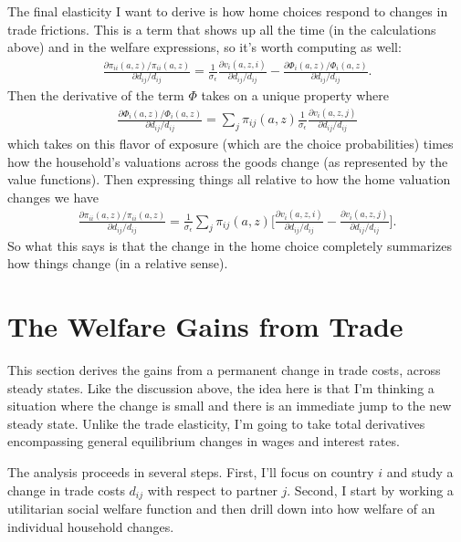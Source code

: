 \documentclass[12pt,pdftex]{article}
\begin{document}
\begin{onehalfspacing}
The final elasticity I want to derive is how home choices respond to changes in trade frictions. This is a term that shows up all the time (in the calculations above) and in the welfare expressions, so it's worth computing as well:
\begin{align}
\frac{\partial \pi_{ii}(a,z) / \pi_{ii}(a,z) }{\partial d_{ij} / d_{ij}} = \frac{1}{\sigma_{\epsilon}}\frac{\partial v_{i}(a,z,i)}{\partial d_{ij}/d_{ij}} - \frac{\partial \Phi_{i}(a,z) / \Phi_{i}(a,z)}{\partial d_{ij}/d_{ij}}.
\end{align}
Then the derivative of the term $\Phi$ takes on a unique property where
\begin{align}
\frac{\partial \Phi_{i}(a,z) / \Phi_{i}(a,z)}{\partial d_{ij}/d_{ij}} = \sum_{j} \pi_{ij}(a,z) \frac{1}{\sigma_{\epsilon}}\frac{\partial v_{i}(a,z,j)}{\partial d_{ij}/d_{ij}}
\end{align}
which takes on this flavor of exposure (which are the choice probabilities) times how the household's valuations across the goods change (as represented by the value functions). Then expressing things all relative to how the home valuation changes we have
\begin{align}
\frac{\partial \pi_{ii}(a,z) / \pi_{ii}(a,z) }{\partial d_{ij} / d_{ij}} = \frac{1}{\sigma_{\epsilon}} \sum_{j} \pi_{ij}(a,z) \bigg[ \frac{\partial v_{i}(a,z,i)}{\partial d_{ij}/d_{ij}} - \frac{\partial v_{i}(a,z,j)}{\partial d_{ij}/d_{ij}} \bigg].
\label{eq:apx-change-home-choice}
\end{align}
So what this says is that the change in the home choice completely summarizes how things change (in a relative sense).

\section{The Welfare Gains from Trade}\label{apx-sec:gains-trade}

This section derives the gains from a permanent change in trade costs, across steady states. Like the discussion above, the idea here is that I'm thinking a situation where the change is small and there is an immediate jump to the new steady state. Unlike the trade elasticity, I'm going to take total derivatives encompassing general equilibrium changes in wages and interest rates.

The analysis proceeds in several steps. First, I'll focus on country $i$ and study a change in trade costs $d_{ij}$ with respect to partner $j$. Second, I start by working a utilitarian social welfare function and then drill down into how welfare of an individual household changes.


\end{onehalfspacing}
\end{document}
